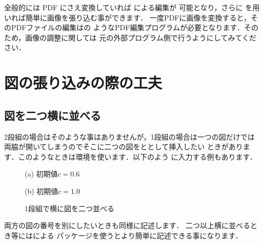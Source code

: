 全般的には PDF にさえ変換していれば  による編集が
可能となり，さらに \Dvipdfmx を用いれば簡単に画像を張り込む事ができます．
一度PDFに画像を変換すると，そのPDFファイルの編集はの
ようなPDF編集プログラムが必要となります．そのため，画像の調整に関しては
元の外部プログラム側で行うようにしてみてください．
%

\section{図の張り込みの際の工夫}


\subsection{図を二つ横に並べる}
2段組の場合はそのような事はありませんが，1段組の場合は一つの図だけでは
両脇が開いてしまうのでそこに二つの図をととして挿入したい
ときがあります．このようなときは環境を使います．以下のよう
に入力する例もあります．

%
\begin{InText}
\begin{figure}[htbp]
  \begin{minipage}{.47\textwidth}
      \centering%
      {\small (a) 初期値$c=0.6$}
  \end{minipage} \hfill
  \begin{minipage}{.47\textwidth}
      \centering%
      {\small (b) 初期値$c=1.0$}
  \end{minipage}
  \caption{1段組で横に図を二つ並べる}
\end{figure}
\end{InText}

両方の図の番号を別にしたいときも同様に記述します．
二つ以上横に並べるとき等にはによる
パッケージを使うとより簡単に記述できる事になります．

